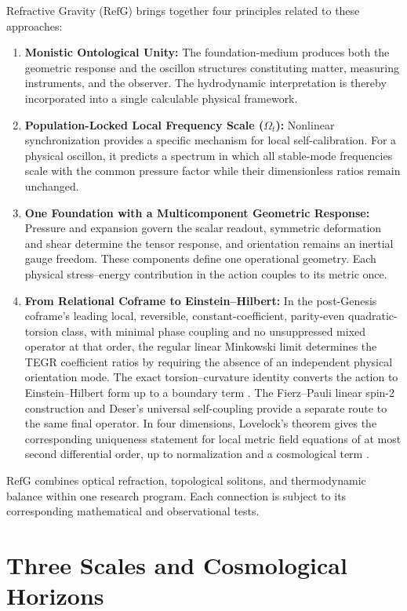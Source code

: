 \documentclass[11pt,a4paper]{article}
\newcommand{\RefG}{\mathrm{RefG}}
\begin{document}
Refractive Gravity ($\RefG$) brings together four principles related to these approaches:
\begin{enumerate}[label=\arabic*.]
\item \textbf{Monistic Ontological Unity:} The foundation-medium produces both the geometric response and the oscillon structures constituting matter, measuring instruments, and the observer. The hydrodynamic interpretation is thereby incorporated into a single calculable physical framework.
\item \textbf{Population-Locked Local Frequency Scale ($\Omega_t$):} Nonlinear synchronization provides a specific mechanism for local self-calibration. For a physical oscillon, it predicts a spectrum in which all stable-mode frequencies scale with the common pressure factor while their dimensionless ratios remain unchanged.
\item \textbf{One Foundation with a Multicomponent Geometric Response:} Pressure and expansion govern the scalar readout, symmetric deformation and shear determine the tensor response, and orientation remains an inertial gauge freedom. These components define one operational geometry. Each physical stress--energy contribution in the action couples to its metric once.
\item \textbf{From Relational Coframe to Einstein--Hilbert:} In the post-Genesis coframe's leading local, reversible, constant-coefficient, parity-even quadratic-torsion class, with minimal phase coupling and no unsuppressed mixed operator at that order, the regular linear Minkowski limit determines the TEGR coefficient ratios by requiring the absence of an independent physical orientation mode. The exact torsion--curvature identity converts the action to Einstein--Hilbert form up to a boundary term \citep{jimenez2020ngr,maluf2013tegr}. The Fierz--Pauli linear spin-2 construction and Deser's universal self-coupling provide a separate route to the same final operator. In four dimensions, Lovelock's theorem gives the corresponding uniqueness statement for local metric field equations of at most second differential order, up to normalization and a cosmological term \citep{deser1970,lovelock1971}.
\end{enumerate}

$\RefG$ combines optical refraction, topological solitons, and thermodynamic balance within one research program. Each connection is subject to its corresponding mathematical and observational tests.

\section{Three Scales and Cosmological Horizons}
\end{document}
